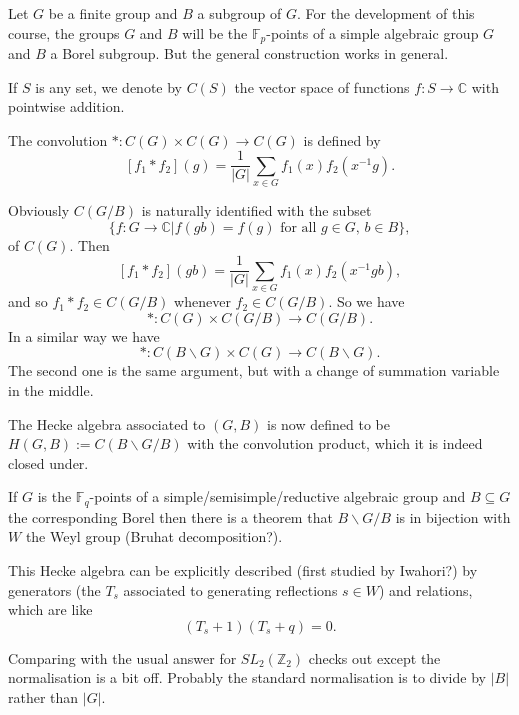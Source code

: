 \documentclass[12pt]{article}
\theoremstyle{plain}
\theoremstyle{definition}
\numberwithin{equation}{section}
\newcommand{\C}{\mathbb{C}}
\newcommand{\F}{\mathbb{F}}
\newcommand{\Z}{\mathbb{Z}}
\begin{document}
Let $G$ be a finite group and $B$ a subgroup of $G$. For the development of this course, the groups $G$ and $B$ will be the $\F_p$-points of a simple algebraic group $G$ and $B$ a Borel subgroup. But the general construction works in general.

If $S$ is any set, we denote by $C(S)$ the vector space of functions $f : S \rightarrow \C$ with pointwise addition.

The convolution $* : C(G) \times C(G) \rightarrow C(G)$ is defined by
\[
[f_1 * f_2](g) = \frac{1}{|G|} \sum_{x \in G} f_1(x) f_2(x^{-1}g).
\]

Obviously $C(G / B)$ is naturally identified with the subset
\[
\{f : G \rightarrow \C | \text{$f(gb) = f(g)$ for all $g \in G$, $b \in B$}\},
\]
of $C(G)$. Then
\[
[f_1 * f_2](gb) = \frac{1}{|G|} \sum_{x \in G} f_1(x) f_2(x^{-1}gb),
\]
and so $f_1 * f_2 \in C(G/B)$ whenever $f_2 \in C(G/B)$. So we have
\[
*: C(G) \times C(G/B) \rightarrow C(G/B).
\]
In a similar way we have
\[
*: C(B \backslash G) \times C(G) \rightarrow C(B \backslash G).
\]
The second one is the same argument, but with a change of summation variable in the middle.


The Hecke algebra associated to $(G, B)$ is now defined to be $H(G, B) := C(B \backslash G / B)$ with the convolution product, which it is indeed closed under.

If $G$ is the $\mathbb{F}_q$-points of a simple/semisimple/reductive algebraic group and $B \subseteq G$ the corresponding Borel then there is a theorem that $B \backslash G / B$ is in bijection with $W$ the Weyl group (Bruhat decomposition?).

This Hecke algebra can be explicitly described (first studied by Iwahori?) by generators (the $T_s$ associated to generating reflections $s \in W$) and relations, which are like
\[
(T_s + 1)(T_s + q) = 0.
\]

Comparing with the usual answer for $SL_2(\Z_2)$ checks out except the normalisation is a bit off. Probably the standard normalisation is to divide by $|B|$ rather than $|G|$.
\end{document}
